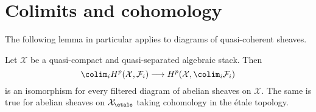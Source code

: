 \section{Colimits and cohomology}
\label{section-colimits}

\noindent
The following lemma in particular applies to diagrams of quasi-coherent
sheaves.

\begin{lemma}
\label{lemma-colimits}
Let $\mathcal{X}$ be a quasi-compact and quasi-separated algebraic stack.
Then
$$
\colim_i H^p(\mathcal{X}, \mathcal{F}_i)
\longrightarrow
H^p(\mathcal{X}, \colim_i \mathcal{F}_i)
$$
is an isomorphism for every filtered diagram of abelian sheaves on
$\mathcal{X}$. The same is true for abelian sheaves on $\mathcal{X}_\etale$
taking cohomology in the \'etale topology.
\end{lemma}

